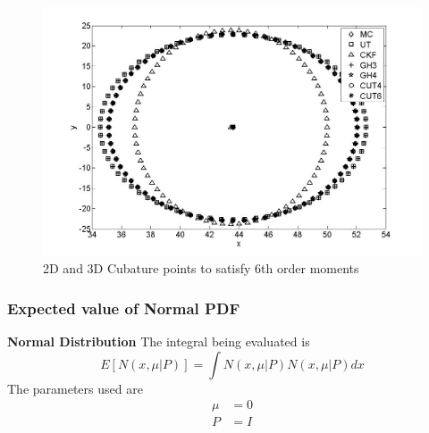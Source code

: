 \documentclass[11pt]{beamer}
\begin{document}
\begin{frame}   
   \begin{figure}[thpb]
      \centering
      \includegraphics[width=1\textwidth]{polartocart}
      \caption{2D and 3D Cubature points to satisfy 6th order moments}
      \label{fig:23d4m1}
   \end{figure} 
\end{frame}
\begin{frame}
\frametitle{Expected value of Normal PDF}
{\bf Normal Distribution}
The integral being evaluated is 
\begin{equation*}
E[N(x,\mu|P)]=\int{N(x,\mu|P)N(x,\mu|P)}dx
\end{equation*}
The parameters used are
\begin{align*}
\mu&=0\\
P&=I
\end{align*}
\end{frame}
\end{document}
